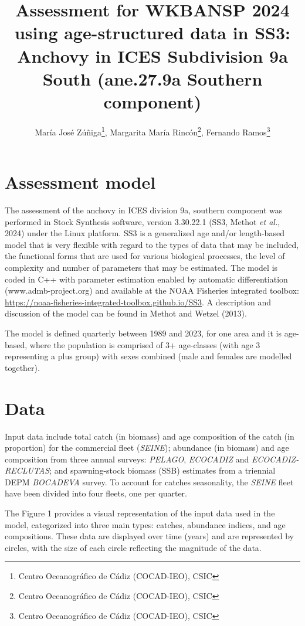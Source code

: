 \documentclass[
]{article}
\title{Assessment for WKBANSP 2024 using age-structured data in SS3:
Anchovy in ICES Subdivision 9a South (ane.27.9a Southern component)}
\author{María José
Zúñiga\thanks{Centro Oceanográfico de Cádiz (COCAD-IEO), CSIC},
Margarita María
Rincón\thanks{Centro Oceanográfico de Cádiz (COCAD-IEO), CSIC}, Fernando
Ramos\thanks{Centro Oceanográfico de Cádiz (COCAD-IEO), CSIC}}
\date{}
\begin{document}
\maketitle

\hypertarget{assessment-model}{%
\section{Assessment model}\label{assessment-model}}

The assessment of the anchovy in ICES division 9a, southern component
was performed in Stock Synthesis software, version 3.30.22.1 (SS3,
Methot \emph{et al.}, 2024) under the Linux platform. SS3 is a
generalized age and/or length-based model that is very flexible with
regard to the types of data that may be included, the functional forms
that are used for various biological processes, the level of complexity
and number of parameters that may be estimated. The model is coded in
C++ with parameter estimation enabled by automatic differentiation
(www.admb-project.org) and available at the NOAA Fisheries integrated
toolbox: \url{https://noaa-fisheries-integrated-toolbox.github.io/SS3}.
A description and discussion of the model can be found in Methot and
Wetzel (2013).

The model is defined quarterly between 1989 and 2023, for one area and
it is age-based, where the population is comprised of 3+ age-classes
(with age 3 representing a plus group) with sexes combined (male and
females are modelled together).

\hypertarget{data}{%
\section{Data}\label{data}}

Input data include total catch (in biomass) and age composition of the
catch (in proportion) for the commercial fleet (\emph{SEINE}); abundance
(in biomass) and age composition from three annual surveys:
\emph{PELAGO}, \emph{ECOCADIZ} and \emph{ECOCADIZ-RECLUTAS}; and
spawning-stock biomass (SSB) estimates from a triennial DEPM
\emph{BOCADEVA} survey. To account for catches seasonality, the
\emph{SEINE} fleet have been divided into four fleets, one per quarter.

The Figure 1 provides a visual representation of the input data used in
the model, categorized into three main types: catches, abundance
indices, and age compositions. These data are displayed over time
(years) and are represented by circles, with the size of each circle
reflecting the magnitude of the data.
\end{document}
